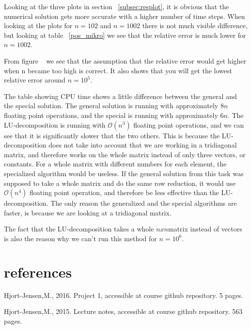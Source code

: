 \documentclass[a4paper,norsk,12pt,oneside]{article}
\begin{document}
Looking at the three plots in section ~\ref{subsec:resplot}, it is obvious
that the numerical solution gets more accurate with a higher number of time steps. 
When looking at the plots for \(n = 102\) and \(n = 1002\) there is not much visible 
difference, but looking at table ~\ref{pos_mikro} we see that the relative error 
is much lower for \(n = 1002\). 

From figure ~ we see that the assumption that the relative error
would get higher when n became too high is correct. It also shows that you will
get the lowest relative error around \(n = 10^5\). 

The table showing CPU time shows a little difference between the general and the
special solution. The general solution is running with approximately \(8n\) floating point 
operations, and the special is running with approximately \(6n\). 
The LU-decomposition is running with \(\mathcal{O}(n^3)\) floating point operations, and we can see
that it is significantly slower that the two others. 
This is because the LU-decomposition does not take into account that we are working
in a tridiagonal matrix, and therefore works on the whole matrix instead of only 
three vectors, or constants.
For a whole matrix with different numbers for each element, the specialized algorithm 
would be useless.
If the general solution from this task was supposed to take a whole matrix and do
the same row reduction, it would use \(\mathcal{O}(n^4)\) floating point operation,
and therefore be less effective than the LU-decomposition. 
The only reason the generalized and the special algorithms are faster, is because
we are looking at a tridiagonal matrix. 

The fact that the LU-decomposition takes a whole \(n x n\)matrix instead of vectors is also the
reason why we can't run this method for \(n = 10^6\).

\section{references} 
Hjort-Jensen,M., 2016. Project 1, accessible at course github repository. 5 pages. 

Hjort-Jensen,M., 2015. Lecture notes, accessible at course github repository. 563 pages. 
\end{document}
